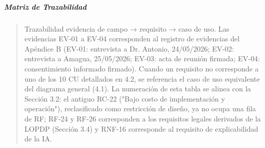 \documentclass[
]{article}
\begin{document}
\subparagraph{Matriz de Trazabilidad}\label{matriz-de-trazabilidad}

\begin{quote}
Trazabilidad evidencia de campo → requisito → caso de uso. Las
evidencias EV-01 a EV-04 corresponden al registro de evidencias del
Apéndice B (EV-01: entrevista a Dr. Antonio, 24/05/2026; EV-02:
entrevista a Amagua, 25/05/2026; EV-03: acta de reunión firmada; EV-04:
consentimiento informado firmado). Cuando un requisito no corresponde a
uno de los 10 CU detallados en 4.2, se referencia el caso de uso
equivalente del diagrama general (4.1). La numeración de esta tabla se
alinea con la Sección 3.2: el antiguo RC-22 ("Bajo costo de
implementación y operación"), reclasificado como restricción de diseño,
ya no ocupa una fila de RF; RF-24 y RF-26 corresponden a los requisitos
legales derivados de la LOPDP (Sección 3.4) y RNF-16 corresponde al
requisito de explicabilidad de la IA.
\end{quote}
\end{document}
